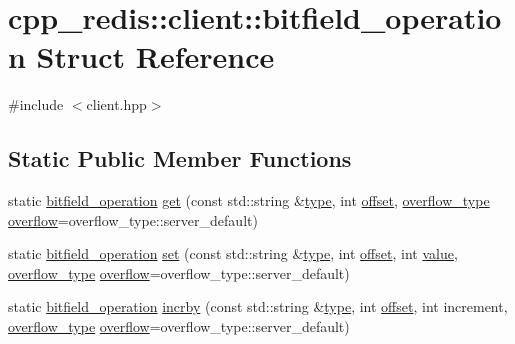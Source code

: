 \hypertarget{structcpp__redis_1_1client_1_1bitfield__operation}{}\section{cpp\+\_\+redis\+:\+:client\+:\+:bitfield\+\_\+operation Struct Reference}
\label{structcpp__redis_1_1client_1_1bitfield__operation}


{\ttfamily \#include $<$client.\+hpp$>$}

\subsection*{Static Public Member Functions}
\begin{DoxyCompactItemize}
\item 
static \hyperlink{structcpp__redis_1_1client_1_1bitfield__operation}{bitfield\+\_\+operation} \hyperlink{structcpp__redis_1_1client_1_1bitfield__operation_a93d3f7ab6b6bae82ac209bb49374d788}{get} (const std\+::string \&\hyperlink{structcpp__redis_1_1client_1_1bitfield__operation_adbbf30e5138d0524940d536b2bc71480}{type}, int \hyperlink{structcpp__redis_1_1client_1_1bitfield__operation_a8a4e83ddbac5c3500c6960f54e736598}{offset}, \hyperlink{classcpp__redis_1_1client_a4119182ad3a01c1bb626a174375e114a}{overflow\+\_\+type} \hyperlink{structcpp__redis_1_1client_1_1bitfield__operation_a2f478e17655a249080178034faa0f6f2}{overflow}=overflow\+\_\+type\+::server\+\_\+default)
\item 
static \hyperlink{structcpp__redis_1_1client_1_1bitfield__operation}{bitfield\+\_\+operation} \hyperlink{structcpp__redis_1_1client_1_1bitfield__operation_a422fc09f99579cea5fcbcbc3464cdd4e}{set} (const std\+::string \&\hyperlink{structcpp__redis_1_1client_1_1bitfield__operation_adbbf30e5138d0524940d536b2bc71480}{type}, int \hyperlink{structcpp__redis_1_1client_1_1bitfield__operation_a8a4e83ddbac5c3500c6960f54e736598}{offset}, int \hyperlink{structcpp__redis_1_1client_1_1bitfield__operation_a8104441f6b9ee7cbf5e6ee6c17c7445c}{value}, \hyperlink{classcpp__redis_1_1client_a4119182ad3a01c1bb626a174375e114a}{overflow\+\_\+type} \hyperlink{structcpp__redis_1_1client_1_1bitfield__operation_a2f478e17655a249080178034faa0f6f2}{overflow}=overflow\+\_\+type\+::server\+\_\+default)
\item 
static \hyperlink{structcpp__redis_1_1client_1_1bitfield__operation}{bitfield\+\_\+operation} \hyperlink{structcpp__redis_1_1client_1_1bitfield__operation_a9e3ad296a689764917df9da1424f33d5}{incrby} (const std\+::string \&\hyperlink{structcpp__redis_1_1client_1_1bitfield__operation_adbbf30e5138d0524940d536b2bc71480}{type}, int \hyperlink{structcpp__redis_1_1client_1_1bitfield__operation_a8a4e83ddbac5c3500c6960f54e736598}{offset}, int increment, \hyperlink{classcpp__redis_1_1client_a4119182ad3a01c1bb626a174375e114a}{overflow\+\_\+type} \hyperlink{structcpp__redis_1_1client_1_1bitfield__operation_a2f478e17655a249080178034faa0f6f2}{overflow}=overflow\+\_\+type\+::server\+\_\+default)
\end{DoxyCompactItemize}
